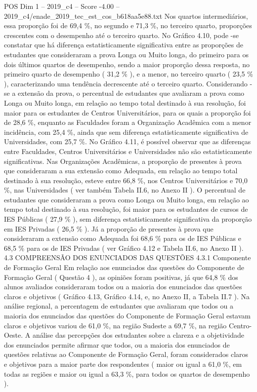\begin{textsample}{POS Dim 1 – 2019\_c4 – Score -4.00 – 2019\_c4/enade\_2019\_tec\_est\_cos\_b618aa5e88.txt}
Nos quartos intermediários, essa proporção foi de 69,4 \%, no segundo e 71,3 \%, no terceiro quarto, proporções crescentes com o desempenho até o terceiro quarto.
No Gráfico 4.10, pode -se constatar que há diferença estatisticamente significativa entre as proporções de estudantes que consideraram a prova Longa ou Muito longa, do primeiro para os dois últimos quartos de desempenho, sendo a maior proporção dessa resposta, no primeiro quarto de desempenho ( 31,2 \% ), e a menor, no terceiro quarto ( 23,5 \% ), caracterizando uma tendência decrescente até o terceiro quarto.
Considerando -se a extensão da prova, o percentual de estudantes que avaliaram a prova como Longa ou Muito longa, em relação ao tempo total destinado à sua resolução, foi maior para os estudantes de Centros Universitários, para os quais a proporção foi de 28,6 \%, enquanto as Faculdades foram a Organização Acadêmica com a menor incidência, com 25,4 \%, ainda que sem diferença estatisticamente significativa de Universidades, com 25,7 \%.
No Gráfico 4.11, é possível observar que as diferenças entre Faculdades, Centros Universitários e Universidades não são estatisticamente significativas.
Nas Organizações Acadêmicas, a proporção de presentes à prova que consideraram a sua extensão como Adequada, em relação ao tempo total destinado à sua resolução, esteve entre 66,8 \%, nos Centros Universitários e 70,0 \%, nas Universidades ( ver também Tabela II.6, no Anexo II ).
O percentual de estudantes que consideraram a prova como Longa ou Muito longa, em relação ao tempo total destinado à sua resolução, foi maior para os estudantes de cursos de IES Públicas ( 27,9 \% ), sem diferença estatisticamente significativa da proporção em IES Privadas ( 26,5 \% ).
Já a proporção de presentes à prova que consideraram a extensão como Adequada foi 68,6 \% para os de IES Públicas e 68,5 \% para os de IES Privadas ( ver Gráfico 4.12 e Tabela II.6, no Anexo II ). 4.3 COMPREENSÃO DOS ENUNCIADOS DAS QUESTÕES 4.3.1 Componente de Formação Geral Em relação aos enunciados das questões do Componente de Formação Geral ( Questão 4 ), as opiniões foram positivas, já que 64,8 \% dos alunos avaliados consideraram todos ou a maioria dos enunciados das questões claros e objetivos ( Gráfico 4.13, Gráfico 4.14, e, no Anexo II, a Tabela II.7 ).
Na análise regional, a percentagem de estudantes que avaliaram que todos ou a maioria dos enunciados das questões do Componente de Formação Geral estavam claros e objetivos variou de 61,0 \%, na região Sudeste a 69,7 \%, na região Centro-Oeste.
A análise das percepções dos estudantes sobre a clareza e a objetividade dos enunciados permite afirmar que todos, ou a maioria dos enunciados de questões relativas ao Componente de Formação Geral, foram considerados claros e objetivos para a maior parte dos respondentes ( maior ou igual a 61,0 \%, em todas as regiões e maior ou igual a 63,3 \%, para todos os quartos de desempenho ).

\end{textsample}
